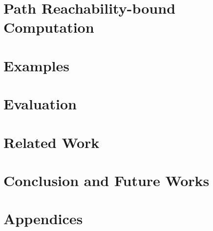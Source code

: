 \documentclass[a4paper,11pt]{article}
\begin{document}
\section{Path Reachability-bound Computation}
\label{sec:pathrb}


% 
\section{Examples}
\label{sec:example}

\section{Evaluation}
\label{sec:eval}

\section{Related Work}
\label{sec:relatedwork}

%
\section{Conclusion and Future Works}
\label{sec:conlusion}

\clearpage




\clearpage

\appendix
{}
\section*{Appendices}

\end{document}
